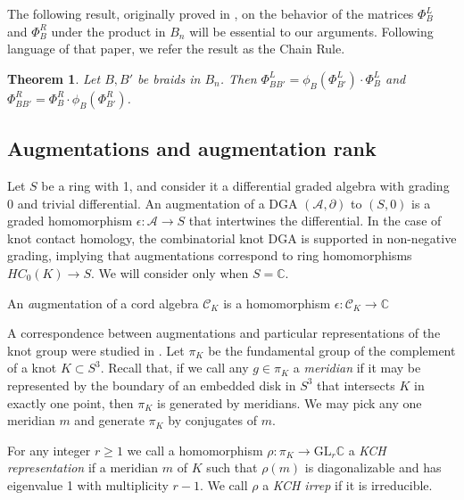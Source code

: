 \documentclass[11pt]{amsart}
\def\C{{\mathbb C}}
\def\A{{\mathcal A}}
\newtheorem{thm}{Theorem}[section]
\newenvironment{definition}[1][Definition]{\begin{trivlist}
\item[\hskip \labelsep {\bfseries #1}]}{\end{trivlist}}
\begin{document}
  The following result, originally proved in \cite{Ng05}, on the behavior of the matrices $\Phi_B^L$ and $\Phi_B^R$ under the product in $B_n$ will be essential to our arguments. Following language of that paper, we refer the result as the Chain Rule.

  \begin{thm} Let $B,B'$ be braids in $B_n$. Then $\Phi_{BB'}^L = \phi_B(\Phi_{B'}^L)\cdot\Phi_B^L$ and $\Phi_{BB'}^R = \Phi_B^R\cdot\phi_B(\Phi_{B'}^R)$.
  \label{thm:ChainRule}
  \end{thm}


\subsection{Augmentations and augmentation rank}
\label{SecBG_AugRk}

  Let $S$ be a ring with 1, and consider it a differential graded algebra with grading 0 and trivial differential. An augmentation of a DGA $(\A,\partial)$ to $(S,0)$ is a graded homomorphism $\epsilon:\A\to S$ that intertwines the differential. In the case of knot contact homology, the combinatorial knot DGA is supported in non-negative grading, implying that augmentations correspond to ring homomorphisms $HC_0(K)\to S$. We will consider only when $S=\C$.

  \begin{definition}
  An {\emph augmentation} of a cord algebra $\mathcal{C}_K$ is a homomorphism $\epsilon\colon \mathcal{C}_K\rightarrow \C$
  \end{definition}

  A correspondence between augmentations and particular representations of the knot group were studied in \cite{Cor13b}. Let $\pi_K$ be the fundamental group of the complement of a knot $K\subset S^3$. Recall that, if we call any $g\in\pi_K$ a \emph{meridian} if it may be represented by the boundary of an embedded disk in $S^3$ that intersects $K$ in exactly one point, then $\pi_K$ is generated by meridians. We may pick any one meridian $m$ and generate $\pi_K$ by conjugates of $m$.

  \begin{definition}
  For any integer $r\ge1$ we call a homomorphism $\rho:\pi_K\to\text{GL}_r\C$ a \emph{KCH representation} if a meridian $m$ of $K$ such that $\rho(m)$ is diagonalizable and has eigenvalue 1 with multiplicity $r-1$. We call $\rho$ a \emph{KCH irrep} if it is irreducible.
  \label{defn:KCHReps}
  \end{definition}
\end{document}
